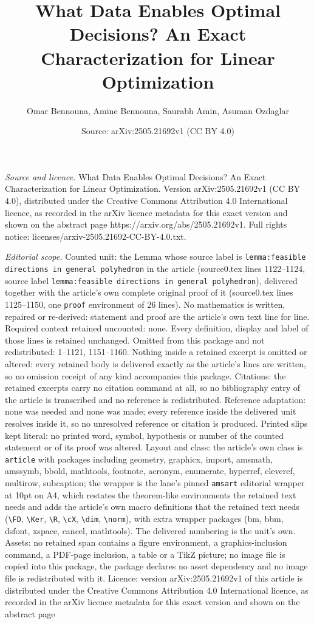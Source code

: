 \documentclass[10pt,a4paper]{amsart}
\title[What Data Enables Optimal Decisions? An Exact Characterizati]{What Data Enables Optimal Decisions? An Exact Characterization for Linear Optimization}
\author{Omar Bennouna, Amine Bennouna, Saurabh Amin, Asuman Ozdaglar}
\date{Source: arXiv:2505.21692v1 (CC BY 4.0)}
\begin{document}
\maketitle

\noindent\emph{Source and licence.} What Data Enables Optimal Decisions? An Exact Characterization for Linear Optimization. Version arXiv:2505.21692v1 (CC BY 4.0), distributed under the Creative Commons Attribution 4.0 International licence, as recorded in the arXiv licence metadata for this exact version and shown on the abstract page https://arxiv.org/abs/2505.21692v1. Full rights notice: licenses/arxiv-2505.21692-CC-BY-4.0.txt.\par\smallskip

\noindent\textit{Editorial scope.} Counted unit: the Lemma whose source label is \texttt{lemma:feasible directions in general polyhedron} in the article (source0.tex lines 1122--1124, source label \texttt{lemma:feasible directions in general polyhedron}), delivered together with the article's own complete original proof of it (source0.tex lines 1125--1150, one \texttt{proof} environment of 26 lines). No mathematics is written, repaired or re-derived: statement and proof are the article's own text line for line. Required context retained uncounted: none. Every definition, display and label of those lines is retained unchanged. Omitted from this package and not redistributed: 1--1121, 1151--1160. Nothing inside a retained excerpt is omitted or altered: every retained body is delivered exactly as the article's lines are written, so no omission receipt of any kind accompanies this package. Citations: the retained excerpts carry no citation command at all, so no bibliography entry of the article is transcribed and no reference is redistributed. Reference adaptation: none was needed and none was made; every reference inside the delivered unit resolves inside it, so no unresolved reference or citation is produced. Printed slips kept literal: no printed word, symbol, hypothesis or number of the counted statement or of its proof was altered. Layout and class: the article's own class is \texttt{article} with packages including geometry, graphicx, import, amsmath, amssymb, bbold, mathtools, footnote, acronym, enumerate, hyperref, cleveref, multirow, subcaption; the wrapper is the lane's pinned \texttt{amsart} editorial wrapper at 10pt on A4, which restates the theorem-like environments the retained text needs and adds the article's own macro definitions that the retained text needs (\texttt{\textbackslash FD}, \texttt{\textbackslash Ker}, \texttt{\textbackslash R}, \texttt{\textbackslash cX}, \texttt{\textbackslash dim}, \texttt{\textbackslash norm}), with extra wrapper packages (bm, bbm, dsfont, xspace, cancel, mathtools). The delivered numbering is the unit's own. Assets: no retained span contains a figure environment, a graphics-inclusion command, a PDF-page inclusion, a table or a TikZ picture; no image file is copied into this package, the package declares no asset dependency and no image file is redistributed with it. Licence: version arXiv:2505.21692v1 of this article is distributed under the Creative Commons Attribution 4.0 International licence, as recorded in the arXiv licence metadata for this exact version and shown on the abstract page 
\end{document}
